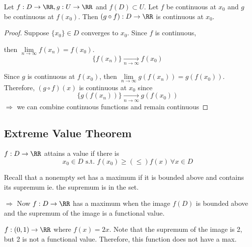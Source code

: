 \documentclass[12pt]{scrartcl}
\begin{document}
\begin{theorem}
  Let $f: D \to \RR, g : U \to\RR$  and $f(D) \subset U$. Let $f$ be continuous at $x_0$ and $g$ be continuous at $f(x_0)$. 
  Then $(g \circ f): D \to \RR$ is continuous at $x_0$. 

  \begin{proof}
    Suppose $\{x_0\} \in D$ converges to $x_0$. Since $f$ is continuous, 
    
    then $\underset{n\to\infty}{\lim}f(x_n) = f(x_0)$. 
    \[\{f(x_n)\} \underset{n\to\infty}{\to}f(x_0)\]

    Since $g$ is continuous at $f(x_0)$, then $\underset{n\to\infty}{\lim}g(f(x_n)) = g(f(x_0))$.
    Therefore, $(g \circ f)(x)$ is continuous at $x_0$ since 
    \[\{g(f(x_n))\} \underset{n\to\infty}{\to} g(f(x_0))\]
    $\Longrightarrow$ we can combine continuous functions and remain continuous
  \end{proof}
\end{theorem}

\subsection{Extreme Value Theorem}

\begin{definition}
  $f: D \to \RR$ attains a  value if there is
  \[x_0 \in D \text{ s.t. } f(x_0) \geq (\leq) f(x) \ \forall x \in D\]
\end{definition}

\begin{remark}
  Recall that a nonempty set has a maximum if it is bounded above and contains its supremum ie. the supremum is in the set.

  \hfill

  $\Longrightarrow$ Now $f: D \to \RR$ has a maximum when the image $f(D)$ is bounded above and 
  the supremum of the image is a functional value. 
\end{remark}

\begin{example}
  $f: (0, 1) \to \RR$ where $f(x) = 2x$. Note that the supremum of the image is 2, but 2 is not a functional value.
  Therefore, this function does not have a max.
\end{example}
\end{document}
